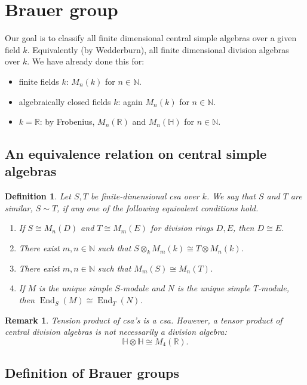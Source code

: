 \documentclass[10pt, a4paper]{article}
\newtheorem{defi}[thm]{Definition}
\newenvironment{noticeB}{%
  \tcolorbox[%
  notitle,
  empty,
  enhanced,  %
  breakable,
  coltext=black,
  colback=white, 
  fontupper=\rmfamily,
  noparskip,
  sharp corners,
  boxrule=-1pt,  %
  frame hidden,
  left=7pt,  %
  right=7pt,
  top=5pt,
  bottom=5pt,
  before skip=2.5ex plus 2pt,
  after skip=2.5ex plus 2pt,
  borderline west = {1.5pt}{-0.1pt}{blue!30!black}, %
  overlay unbroken and last={%
    \draw[color=black, line width=1.25pt]
    ($(frame.south west)+(1.pt, -0.1pt)$) -- ++(2em, 0);
  }
  ]}
{\endtcolorbox}
\newenvironment{definition}{\begin{noticeB}\begin{defi}}{%
    \end{defi}\end{noticeB}}
\newtheorem*{remark}{Remark}
\newcommand{\N}{\mathbb {N}}
\newcommand{\R}{\mathbb {R}}
\newcommand{\Ha}{\mathbb {H}}
\DeclareMathOperator{\en}{End}
\begin{document}
\section{Brauer group}

Our goal is to classify all finite dimensional central simple algebras over a given field $k$.
Equivalently (by Wedderburn), all finite dimensional division algebras over $k$.
We have already done this for:
\begin{itemize}
  \item finite fields $k$: $M_n (k)$ for $n \in \N$.
  \item algebraically closed fields $k$: again $M_n (k)$ for $n \in \N$.
  \item $k = \R$: by Frobenius, $M_n (\R)$ and $M_n (\Ha)$ for $n \in \N$.
\end{itemize}

\subsection{An equivalence relation on central simple algebras}

\begin{definition}
  Let $S, T$ be finite-dimensional csa over $k$. We say that $S$ and $T$ are similar, $S \sim T$,
  if any one of the following equivalent conditions hold.
  \begin{enumerate}
    \item If $S \cong M_n (D)$ and $T \cong M_m (E)$ for division rings $D, E$, then $D \cong E$.
    \item There exist $m, n \in \N$ such that $S \otimes_k M_m (k) \cong T \otimes M_n (k)$.
    \item There exist $m, n \in \N$ such that $M_m (S) \cong M_n (T)$.
    \item If $M$ is the unique simple $S$-module and $N$ is the unique simple $T$-module, then 
    $\en_S (M) \cong \en_T (N)$.
  \end{enumerate}
\end{definition}

\begin{remark}
  Tension product of csa's is a csa. However, a tensor product of central division algebras is not necessarily a division algebra:
  $$\Ha \otimes \Ha \cong M_4 (\R).$$
\end{remark}

\subsection{Definition of Brauer groups}
\end{document}

